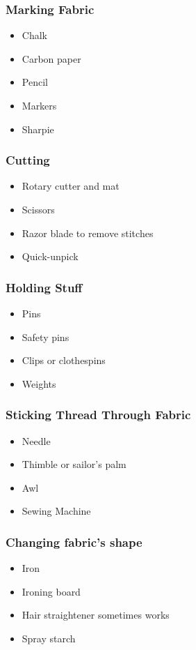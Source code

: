 \documentclass{beamer}
\begin{document}
\begin{frame}[fragile]
\frametitle{Marking Fabric}
\begin{itemize}[<+(1)->]
\item Chalk
\item Carbon paper
\item Pencil
\item Markers
\item Sharpie
\end{itemize}
\end{frame}

\begin{frame}[fragile]
\frametitle{Cutting}
\begin{itemize}[<+(1)->]
\item Rotary cutter and mat
\item Scissors
\item Razor blade to remove stitches
\item Quick-unpick
\end{itemize}
\end{frame}

\begin{frame}[fragile]
\frametitle{Holding Stuff}
\begin{itemize}[<+(1)->]
\item Pins
\item Safety pins
\item Clips or clothespins
\item Weights
\end{itemize}
\end{frame}

\begin{frame}[fragile]
\frametitle{Sticking Thread Through Fabric}
\begin{itemize}[<+(1)->]
\item Needle
\item Thimble or sailor's palm
\item Awl
\item Sewing Machine
\end{itemize}
\end{frame}

\begin{frame}[fragile]
\frametitle{Changing fabric's shape}
\begin{itemize}[<+(1)->]
\item Iron
\item Ironing board
\item Hair straightener sometimes works
\item Spray starch
\end{itemize}
\end{frame}
\end{document}
